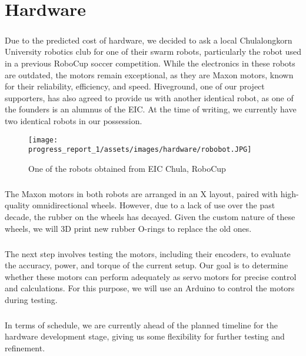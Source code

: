 \chapter{Hardware}

\paragraph*{}
Due to the predicted cost of hardware, we decided to ask a local Chulalongkorn University robotics club for one of their swarm robots, particularly the robot used in a previous RoboCup soccer competition. While the electronics in these robots are outdated, the motors remain exceptional, as they are Maxon motors, known for their reliability, efficiency, and speed. Hiveground, one of our project supporters, has also agreed to provide us with another identical robot, as one of the founders is an alumnus of the EIC. At the time of writing, we currently have two identical robots in our possession.
\begin{figure}[H]
    \centering
    \texttt{[image: progress\_report\_1/assets/images/hardware/robobot.JPG]}
    \caption{One of the robots obtained from EIC Chula, RoboCup}
    \label{fig:robobot}
\end{figure}
\paragraph*{}
The Maxon motors in both robots are arranged in an X layout, paired with high-quality omnidirectional wheels. However, due to a lack of use over the past decade, the rubber on the wheels has decayed. Given the custom nature of these wheels, we will 3D print new rubber O-rings to replace the old ones.
\paragraph*{}
The next step involves testing the motors, including their encoders, to evaluate the accuracy, power, and torque of the current setup. Our goal is to determine whether these motors can perform adequately as servo motors for precise control and calculations. For this purpose, we will use an Arduino to control the motors during testing.
\paragraph*{}
In terms of schedule, we are currently ahead of the planned timeline for the hardware development stage, giving us some flexibility for further testing and refinement.